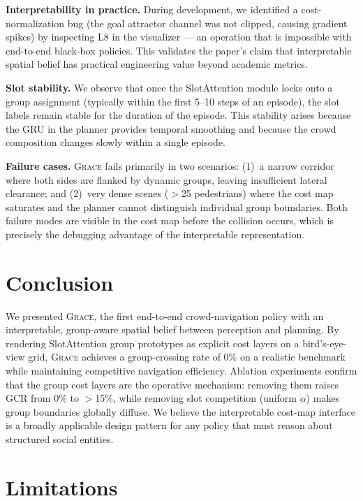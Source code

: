 \documentclass{article}
\newcommand{\grace}{\textsc{Grace}}
\begin{document}
\textbf{Interpretability in practice.}
During development, we identified a cost-normalization bug (the goal attractor
channel was not clipped, causing gradient spikes) by inspecting L8 in the
visualizer — an operation that is impossible with end-to-end black-box policies.
This validates the paper's claim that interpretable spatial belief has
practical engineering value beyond academic metrics.

\textbf{Slot stability.}
We observe that once the SlotAttention module locks onto a group assignment
(typically within the first 5–10 steps of an episode), the slot labels remain
stable for the duration of the episode. This stability arises because the GRU
in the planner provides temporal smoothing and because the crowd composition
changes slowly within a single episode.

\textbf{Failure cases.}
\grace{} fails primarily in two scenarios:
(1)~a narrow corridor where both sides are flanked by dynamic groups, leaving
insufficient lateral clearance; and
(2)~very dense scenes ($>$25 pedestrians) where the cost map saturates and
the planner cannot distinguish individual group boundaries. Both failure modes
are visible in the cost map before the collision occurs, which is precisely
the debugging advantage of the interpretable representation.

\section{Conclusion}
\label{sec:conclusion}

We presented \grace{}, the first end-to-end crowd-navigation policy with an
interpretable, group-aware spatial belief between perception and planning.
By rendering SlotAttention group prototypes as explicit cost layers on a
bird's-eye-view grid, \grace{} achieves a group-crossing rate of 0\% on a
realistic benchmark while maintaining competitive navigation efficiency.
Ablation experiments confirm that the group cost layers are the operative
mechanism: removing them raises GCR from 0\% to $>$15\%, while removing
slot competition (uniform $\alpha$) makes group boundaries globally diffuse.
We believe the interpretable cost-map interface is a broadly applicable
design pattern for any policy that must reason about structured social entities.

\section{Limitations}
\label{sec:limitations}
\end{document}
